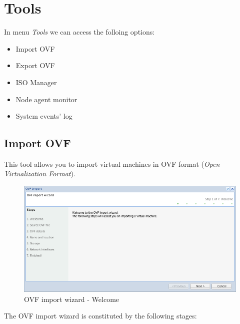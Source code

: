 \section{Tools}

In menu \emph{Tools} we can access the folloing options:
\begin{itemize}
\item Import OVF
\item Export OVF
\item ISO Manager
\item Node agent monitor
\item System events' log
\end{itemize}

\subsection{Import OVF}
This tool allows you to import virtual machines in OVF format (\emph{Open Virtualization Format}).

\begin{figure}[H]
	\begin{center}
	\includegraphics[scale=0.5]{screenshots/ovf_import.png}
	\caption{OVF import wizard - Welcome}
	\label{fig:ovf_import_wiz}
	\end{center}
\end{figure}
The OVF import wizard is constituted by the following stages:

